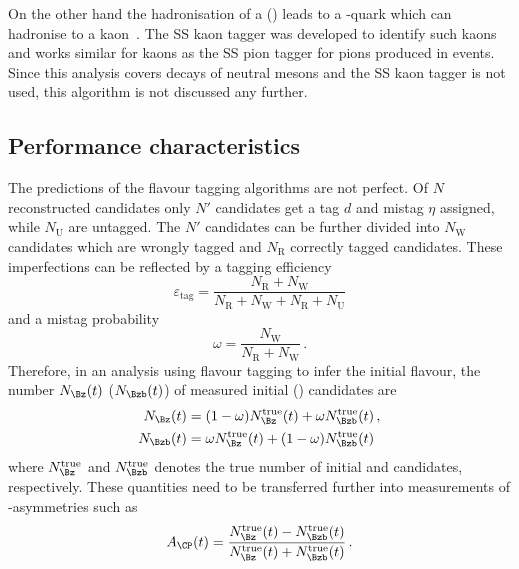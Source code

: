 On the other hand the hadronisation of a \Bs (\bquarkbar\squark) leads to a \squarkbar-quark which can hadronise to a kaon~\cite{Aaij:2016psi}.
The SS kaon tagger was developed to identify such kaons and works similar for kaons as the SS pion tagger for pions produced in \Bz events.
Since this analysis covers decays of neutral \Bz mesons and the SS kaon tagger is not used, this algorithm is not discussed any further.

\subsection{Performance characteristics}

The predictions of the flavour tagging algorithms are not perfect.
Of $N$ reconstructed candidates only $N'$ candidates get a tag $d$ and mistag $\eta$ assigned, while $N_{\text{U}}$ are untagged.
The $N'$ candidates can be further divided into $N_{\text{W}}$ candidates which are wrongly tagged and $N_{\text{R}}$ correctly tagged candidates.
These imperfections can be reflected by a tagging efficiency
\begin{equation}
\varepsilon_{\text{tag}}=\frac{N_{\text{R}}+N_{\text{W}}}{N_{\text{R}}+N_{\text{W}}+N_{\text{R}}+N_{\text{U}}}\label{eq:tageff}
\end{equation}
and a mistag probability
\begin{equation}
\omega=\frac{N_{\text{W}}}{N_{\text{R}}+N_{\text{W}}}\,.\label{eq:mistag}
\end{equation}
Therefore, in an analysis using flavour tagging to infer the initial \B flavour, the number $N_{\Bz}(t)$ ($N_{\Bzb}(t)$) of measured initial \Bz (\Bzb) candidates are
\begin{equation}
\begin{aligned}
N_{\Bz}(t)&=(1-\omega)N_{\Bz}^{\text{true}}(t)+\omega N_{\Bzb}^{\text{true}}(t)\,,\\
N_{\Bzb}(t)&=\omega N_{\Bz}^{\text{true}}(t)+(1-\omega)N_{\Bzb}^{\text{true}}(t)
\end{aligned}
\end{equation}
where $N_{\Bz}^{\text{true}}$ and $N_{\Bzb}^{\text{true}}$ denotes the true number of initial \Bz and \Bzb candidates, respectively.
These quantities need to be transferred further into measurements of \CP-asymmetries such as
\begin{equation}
A_{\CP}(t)=\frac{N_{\Bz}^{\text{true}}(t)-N_{\Bzb}^{\text{true}}(t)}{N_{\Bz}^{\text{true}}(t)+N_{\Bzb}^{\text{true}}(t)}\,.
\end{equation}
